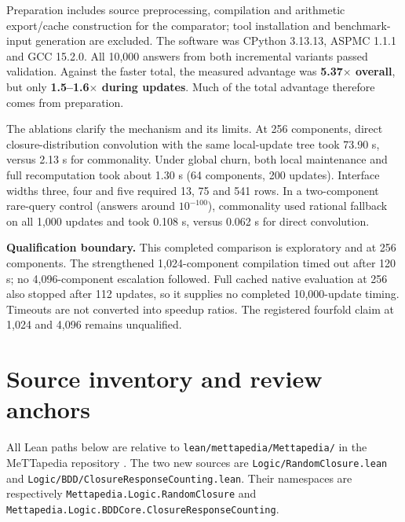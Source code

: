 \documentclass[11pt,a4paper]{article}
\newcommand{\code}[1]{\nolinkurl{#1}}
\begin{document}
Preparation includes source preprocessing, compilation and arithmetic
export/cache construction for the comparator; tool installation and
benchmark-input generation are excluded. The software was CPython 3.13.13,
ASPMC 1.1.1 and GCC 15.2.0. All 10,000 answers from both incremental variants
passed validation. Against the faster total, the measured advantage was
\textbf{5.37$\times$ overall}, but only \textbf{1.5--1.6$\times$ during updates}.
Much of the total advantage therefore comes from preparation.

The ablations clarify the mechanism and its limits. At 256 components, direct
closure-distribution convolution with the same local-update tree took 73.90 s,
versus 2.13 s for commonality. Under global churn, both local maintenance and
full recomputation took about 1.30 s (64 components, 200 updates). Interface
widths three, four and five required 13, 75 and 541 rows. In a two-component
rare-query control (answers around $10^{-100}$), commonality used rational
fallback on all 1,000 updates and took
0.108 s, versus 0.062 s for direct convolution.

\textbf{Qualification boundary.} This completed comparison is exploratory and
at 256 components. The strengthened 1,024-component compilation timed out
after 120 s; no 4,096-component escalation followed. Full cached native
evaluation at 256 also stopped after 112 updates, so it supplies no completed
10,000-update timing. Timeouts are not converted into speedup ratios.
The registered fourfold claim at 1,024 and 4,096 remains unqualified.

\clearpage
\appendix
\begingroup\small
\setlength{\parskip}{3pt}
\section{Source inventory and review anchors}

All Lean paths below are relative to \code{lean/mettapedia/Mettapedia/} in the
MeTTapedia repository \cite{mettapedia}. The two new sources are
\code{Logic/RandomClosure.lean} and
\code{Logic/BDD/ClosureResponseCounting.lean}. Their namespaces are respectively
\code{Mettapedia.Logic.RandomClosure} and
\code{Mettapedia.Logic.BDDCore.ClosureResponseCounting}.
\end{document}
